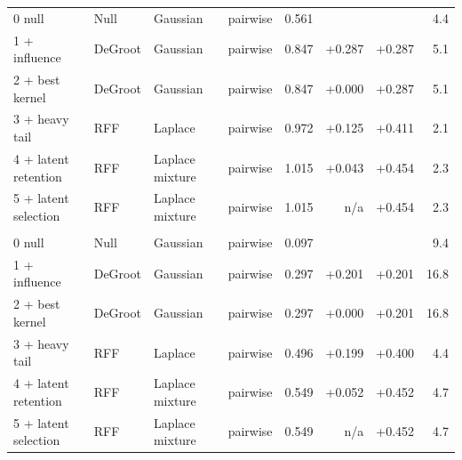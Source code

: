 \begin{longtable}{llllrrrr}
0 null & Null & Gaussian & pairwise & 0.561 &  &  & 4.4 \\
1 + influence & DeGroot & Gaussian & pairwise & 0.847 & +0.287 & +0.287 & 5.1 \\
2 + best kernel & DeGroot & Gaussian & pairwise & 0.847 & +0.000 & +0.287 & 5.1 \\
3 + heavy tail & RFF & Laplace & pairwise & 0.972 & +0.125 & +0.411 & 2.1 \\
4 + latent retention & RFF & Laplace mixture & pairwise & 1.015 & +0.043 & +0.454 & 2.3 \\
5 + latent selection & RFF & Laplace mixture & pairwise & 1.015 & n/a & +0.454 & 2.3 \\
\midrule
\multicolumn{8}{l}{\takacsOne{}} \\
0 null & Null & Gaussian & pairwise & 0.097 &  &  & 9.4 \\
1 + influence & DeGroot & Gaussian & pairwise & 0.297 & +0.201 & +0.201 & 16.8 \\
2 + best kernel & DeGroot & Gaussian & pairwise & 0.297 & +0.000 & +0.201 & 16.8 \\
3 + heavy tail & RFF & Laplace & pairwise & 0.496 & +0.199 & +0.400 & 4.4 \\
4 + latent retention & RFF & Laplace mixture & pairwise & 0.549 & +0.052 & +0.452 & 4.7 \\
5 + latent selection & RFF & Laplace mixture & pairwise & 0.549 & n/a & +0.452 & 4.7 \\
\bottomrule
\end{longtable}
